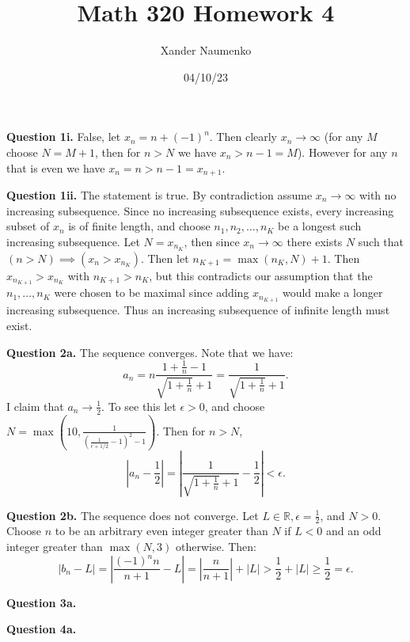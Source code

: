\documentclass[letterpaper, reqno,11pt]{article}
\begin{document}
\title{Math 320 Homework 4}
\date{04/10/23}
\author{Xander Naumenko}
\maketitle

{\medskip\noindent\bf Question 1i.} False, let $x_n=n+(-1)^{n}$. Then clearly $x_n\to\infty$ (for any $M$ choose $N=M+1$, then for $n>N$ we have $x_n>n-1=M$). However for any $n$ that is even we have $x_n=n>n-1=x_{n+1}$.

{\medskip\noindent\bf Question 1ii.} The statement is true. By contradiction assume $x_n\to \infty$ with no increasing subsequence. Since no increasing subsequence exists, every increasing subset of $x_n$ is of finite length, and choose $n_1,n_2,\ldots,n_K$ be a longest such increasing subsequence. Let $N=x_{n_K}$, then since $x_n\to\infty$ there exists $N$ such that $(n>N)\implies\left( x_n>x_{n_K} \right) $. Then let $n_{K+1}=\max(n_K,N)+1$. Then $x_{n_{K+1}}>x_{n_K}$ with $n_{K+1}>n_K$, but this contradicts our assumption that the $n_1,\ldots,n_K$ were chosen to be maximal since adding $x_{n_{K+1}}$ would make a longer increasing subsequence. Thus an increasing subsequence of infinite length must exist.

{\medskip\noindent\bf Question 2a.} The sequence converges. Note that we have:
\[
a_{n}=n \frac{1+\frac{1}{n}-1}{\sqrt{1+\frac{1}{n}}+1}=\frac{1}{\sqrt{1+\frac{1}{n}}+1}
.\]
I claim that $a_n\to \frac{1}{2}$. To see this let $\epsilon>0$, and choose $N=\max\left(10,\frac{1}{\left( \frac{1}{\epsilon+1 /2}-1 \right) ^2-1}\right)$. Then for $n>N$,
\[
|a_n-\frac{1}{2}|=\left| \frac{1}{\sqrt{1+\frac{1}{n}}+1} -\frac{1}{2}\right|<\epsilon
.\]

{\medskip\noindent\bf Question 2b.} The sequence does not converge. Let $L\in \mathbb{R},\epsilon=\frac{1}{2}$, and $N>0$. Choose $n$ to be an arbitrary even integer greater than $N$ if $L<0$ and an odd integer greater than $\max(N, 3)$ otherwise. Then:
\[
\left| b_n-L \right| =\left| \frac{(-1)^{n}n}{n+1}-L \right|=\left| \frac{n}{n+1} \right| +|L|> \frac{1}{2}+|L|\geq \frac{1}{2}=\epsilon
.\]

{\medskip\noindent\bf Question 3a.} 

{\medskip\noindent\bf Question 4a.} 
\end{document}

